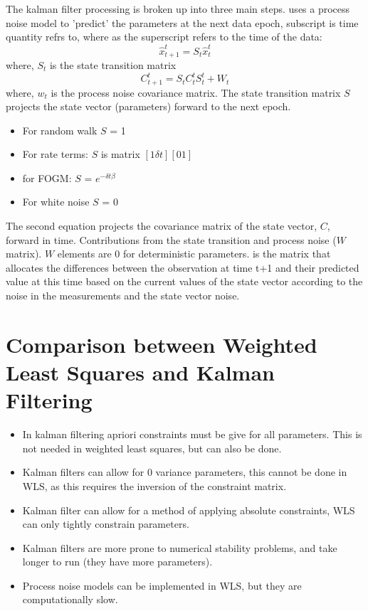 The kalman filter processing is broken up into three main steps.
 uses a process noise model to 'predict' the parameters at the next data epoch, subscript is time quantity refrs to, where as the superscript refers to the time of the data:
\begin{equation}
    \hat{x}_{t+1}^t = S_t \hat{x}_t^t
\end{equation}
where, $S_t$ is the state transition matrix
\begin{equation}
    C_{t+1}^t = S_t C_t^t S_t^t + W_t
\end{equation}
where, $w_t$ is the process noise covariance matrix.
The state transition matrix $S$ projects the state vector (parameters) forward to the next epoch.
\begin{itemize}
    \item For random walk $S$ = 1
    \item For rate terms: $S$ is matrix $[1 \delta t][0 1]$
    \item for FOGM: $S$ = $e^{-\delta t \beta}$
    \item For white noise $S$ = 0
\end{itemize}
The second equation projects the covariance matrix of the state vector, $C$, forward in time. Contributions from the state transition and process noise ($W$ matrix). $W$ elements are 0 for deterministic parameters.
%
 is the matrix that allocates the differences between the observation at time t+1 and their predicted value at this time based on the current values of the state vector according to the noise in the measurements and the state vector noise.

\section{Comparison between Weighted Least Squares and Kalman Filtering}

\begin{itemize}
    \item In kalman filtering apriori constraints must be give for all parameters. This is not needed in weighted least squares, but can also be done.
    \item Kalman filters can allow for 0 variance parameters, this cannot be done in WLS, as this requires the inversion of the constraint matrix.
    \item Kalman filter can allow for a method of applying absolute constraints, WLS can only tightly constrain parameters.
    \item Kalman filters are more prone to numerical stability problems, and take longer to run (they have more parameters).
    \item Process noise models can be implemented in WLS, but they are computationally slow.
\end{itemize}

